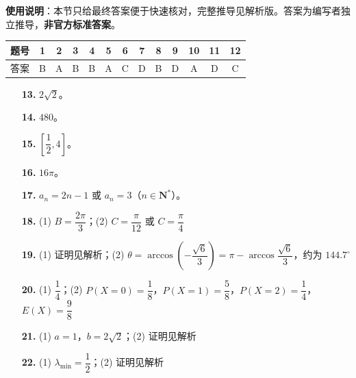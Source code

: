 
\begin{gknotice}
\textbf{使用说明}：本节只给最终答案便于快速核对，完整推导见解析版。答案为编写者独立推导，\textbf{非官方标准答案}。
\end{gknotice}

\begin{center}\begin{tabular}{ccccccccccccc}
\toprule
题号 & 1 & 2 & 3 & 4 & 5 & 6 & 7 & 8 & 9 & 10 & 11 & 12 \\
\midrule
答案 & B & A & B & B & A & C & D & B & D & A & D & C \\
\bottomrule
\end{tabular}\end{center}

\begin{itemize}[leftmargin=2.6em]
  \item[\textbf{13.}] $2\sqrt2$。
  \item[\textbf{14.}] $480$。
  \item[\textbf{15.}] $\left[\dfrac12,4\right]$。
  \item[\textbf{16.}] $16\pi$。
\end{itemize}

\begin{itemize}[leftmargin=2.6em]
  \item[\textbf{17.}] $a_n=2n-1$ 或 $a_n=3$（$n\in\mathbf N^*$）。
  \item[\textbf{18.}] (1) $B=\dfrac{2\pi}3$；(2) $C=\dfrac{\pi}{12}$ 或 $C=\dfrac\pi4$
  \item[\textbf{19.}] (1) 证明见解析；(2) $\theta=\arccos\left(-\dfrac{\sqrt6}3\right)=\pi-\arccos\dfrac{\sqrt6}3$，约为 $144.7^\circ$
  \item[\textbf{20.}] (1) $\dfrac14$；(2) $P(X=0)=\dfrac18$，$P(X=1)=\dfrac58$，$P(X=2)=\dfrac14$，$E(X)=\dfrac98$
  \item[\textbf{21.}] (1) $a=1$，$b=2\sqrt2$；(2) 证明见解析
  \item[\textbf{22.}] (1) $\lambda_{\min}=\dfrac12$；(2) 证明见解析
\end{itemize}
